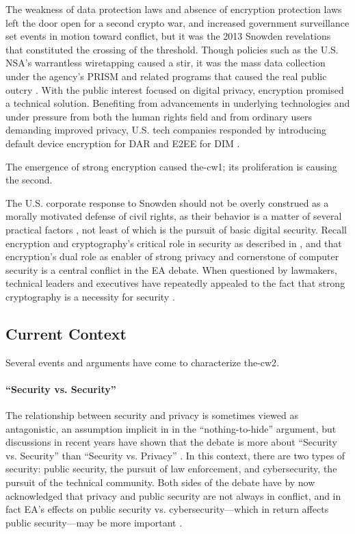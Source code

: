 The weakness of data protection laws and absence of encryption protection laws left the door open for a second crypto
war, and increased government surveillance set events in motion toward conflict, but it was the 2013 Snowden revelations
that constituted the crossing of the threshold. Though policies such as the U.S. \ac{NSA}'s warrantless wiretapping
caused a stir, it was the mass data collection under the agency's \ac{PRISM} and related programs that caused the real
public outcry \cite{landau_making_2013}. With the public interest focused on digital privacy, encryption promised a
technical solution. Benefiting from advancements in underlying technologies and under pressure from both the human
rights field and from ordinary users demanding improved privacy, U.S. tech companies responded by introducing default
device encryption for \acl{DAR} and \acl{E2EE} for \acl{DIM} \cite{treguer_us_2018}.

The emergence of strong encryption caused \ac{the-cw1}; its proliferation is causing the second.

The U.S. corporate response to Snowden should not be overly construed as a morally motivated defense of civil rights, as
their behavior is a matter of several practical factors \cite{treguer_us_2018}, not least of which is the pursuit of
basic digital security. Recall encryption and cryptography's critical role in security as described in
, and that encryption's dual role as enabler of strong privacy and cornerstone of computer
security is a central conflict in the \ac{EA} debate. When questioned by lawmakers, technical leaders and executives
have repeatedly appealed to the fact that strong cryptography is a necessity for security \cite{schulze_clipper_2017}.

\subsection{Current Context}
\label{sec-history-current}

Several events and arguments have come to characterize \ac{the-cw2}.

\paragraph*{``Security vs. Security''} The relationship between security and privacy is sometimes viewed as
antagonistic, an assumption implicit in in the ``nothing-to-hide'' argument, but discussions in recent years have shown
that the debate is more about ``Security vs. Security'' than ``Security vs. Privacy''
\cite{stalla_bourdillon_privacy_2014}. In this context, there are two types of security: public security, the pursuit of
law enforcement, and cybersecurity, the pursuit of the technical community. Both sides of the debate have by now
acknowledged that privacy and public security are not always in conflict, and in fact \ac{EA}'s effects on public
security vs. cybersecurity---which in return affects public security---may be more important \cite{schneier_2019}.

